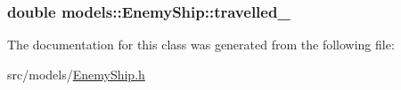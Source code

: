 \hypertarget{classmodels_1_1EnemyShip_a2d95522beb6de8ac6d24fd1dd49969ed}{
\subsubsection[{travelled\-\_\-}]{\setlength{\rightskip}{0pt plus 5cm}double {\bf models\-::\-Enemy\-Ship\-::travelled\-\_\-}}}\label{d1/d22/classmodels_1_1EnemyShip_a2d95522beb6de8ac6d24fd1dd49969ed}


\-The documentation for this class was generated from the following file\-:\begin{DoxyCompactItemize}
\item 
src/models/\hyperlink{EnemyShip_8h}{\-Enemy\-Ship.\-h}\end{DoxyCompactItemize}
